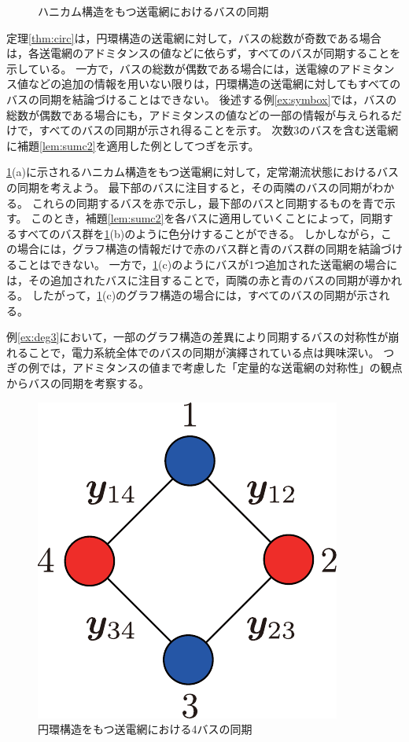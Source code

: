 \documentclass[tombow,dvipdfmx]{corona-a5}
\begin{document}
\begin{figure}[t]
{\begin{minipage}{0.3\linewidth}
    \subcaption{  }
  \end{minipage}
  \caption{ハニカム構造をもつ送電網におけるバスの同期}
  \label{fig:hony}
  }
\end{figure}

定理\ref{thm:circ}は，円環構造の送電網に対して，バスの総数が奇数である場合は，各送電網のアドミタンスの値などに依らず，すべてのバスが同期することを示している。
一方で，バスの総数が偶数である場合には，送電線のアドミタンス値などの追加の情報を用いない限りは，円環構造の送電網に対してもすべてのバスの同期を結論づけることはできない。
後述する例\ref{ex:symbox}では，バスの総数が偶数である場合にも，アドミタンスの値などの一部の情報が与えられるだけで，すべてのバスの同期が示され得ることを示す。
次数3のバスを含む送電網に補題\ref{lem:sumc2}を適用した例としてつぎを示す。

\begin{例}[ハニカム構造の送電網におけるバスの同期]\label{ex:deg3}
\ref{fig:hony}(a)に示されるハニカム構造をもつ送電網に対して，定常潮流状態におけるバスの同期を考えよう。
最下部のバスに注目すると，その両隣のバスの同期がわかる。
これらの同期するバスを赤で示し，最下部のバスと同期するものを青で示す。
このとき，補題\ref{lem:sumc2}を各バスに適用していくことによって，同期するすべてのバス群を\ref{fig:hony}(b)のように色分けすることができる。
しかしながら，この場合には，グラフ構造の情報だけで赤のバス群と青のバス群の同期を結論づけることはできない。
一方で，\ref{fig:hony}(c)のようにバスが1つ追加された送電網の場合には，その追加されたバスに注目することで，両隣の赤と青のバスの同期が導かれる。
したがって，\ref{fig:hony}(c)のグラフ構造の場合には，すべてのバスの同期が示される。
\end{例}

例\ref{ex:deg3}において，一部のグラフ構造の差異により同期するバスの対称性が崩れることで，電力系統全体でのバスの同期が演繹されている点は興味深い。
つぎの例では，アドミタンスの値まで考慮した「定量的な送電網の対称性」の観点からバスの同期を考察する。

\begin{figure}[t]
\centering
\includegraphics[width = .18\linewidth]{figs/4busbox}
\caption{円環構造をもつ送電網における4バスの同期}
\label{fig:4busbox}
\end{figure}
\end{document}
